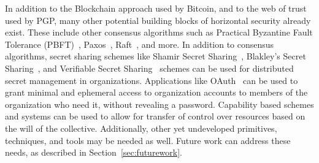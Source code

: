 In addition to the Blockchain approach used by Bitcoin, and to the web of trust
used by PGP, many other potential building blocks of horizontal security already
exist. These include other consensus algorithms such as Practical Byzantine
Fault Tolerance (PBFT)~\cite{castro1999practical}, Paxos~\cite{lamport2019part}, 
Raft~\cite{ongaro2013search}, and more. In addition to consensus algorithms,
secret sharing schemes like Shamir Secret Sharing~\cite{shamir1979share}, 
Blakley's Secret Sharing~\cite{blakley1993linear}, and Verifiable Secret 
Sharing~\cite{chor1985verifiable} schemes can be used for distributed secret
management in organizations. Applications like OAuth~\cite{leiba2012oauth} can
be used to grant minimal and ephemeral access to organization accounts to
members of the organization who need it, without revealing a password. 
Capability based schemes and systems can be used to allow for transfer of
control over resources based on the will of the collective. Additionally, other
yet undeveloped primitives, techniques, and tools may be needed as well. Future
work can address these needs, as described in Section~\ref{sec:futurework}.




